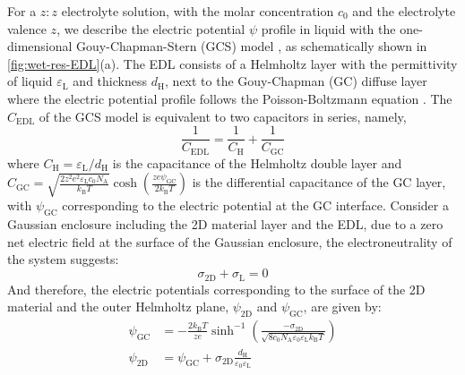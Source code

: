 For a \(z:z\) electrolyte solution, with the molar concentration
\(c_{0}\) and the electrolyte valence \(z\), we describe the electric
potential $\psi$ profile in liquid with the one-dimensional
Gouy-Chapman-Stern (GCS) model \cite{Stern_1924_theory}, as schematically
shown in \autoref{fig:wet-res-EDL}(a).
%
The EDL consists of a
Helmholtz layer with the permittivity of liquid
\(\varepsilon_{\mathrm{L}}\) and thickness \(d_{\mathrm{H}}\), next to
the Gouy-Chapman (GC) diffuse layer where the electric potential
profile follows the Poisson-Boltzmann equation
\cite{Bard_1980_electrochem_book}.
%
The \(C_{\mathrm{EDL}}\) of the
GCS model is equivalent to two capacitors in series,
namely,
\begin{equation}
\label{eqn:wet-GCS-capacitance-series}
\frac{1}{C_{\mathrm{EDL}}} = \frac{1}{C_{\mathrm{H}}} + \frac{1}{C_{\mathrm{GC}}}
\end{equation}
where \(C_{\mathrm{H}}=\varepsilon_{\mathrm{L}}/d_{\mathrm{H}}\) is the
capacitance of the Helmholtz double layer and
\(C_{\mathrm{GC}}=\sqrt{\frac{2z^{2}e^{2}\varepsilon_{\mathrm{L}}c_{0}N_{\mathrm{A}}}{k_{\mathrm{B}}T}}
\cosh(\frac{ze\psi_{\mathrm{GC}}}{2k_{\mathrm{B}}T})\) is the
differential capacitance of the GC layer, with \(\psi_{\mathrm{GC}}\)
corresponding to the electric potential at the GC interface.
%
Consider
a Gaussian enclosure including the 2D material layer and the EDL, due
to a zero net electric field at the surface of the Gaussian enclosure,
the electroneutrality of the system \cite{Bard_1980_electrochem_book}
suggests:
\begin{equation}
\label{eqn:wet-neutrality}
\sigma_{\mathrm{2D}} + \sigma_{\mathrm{L}} = 0
\end{equation}
And therefore, the electric potentials corresponding to the surface of
the 2D material and the outer Helmholtz plane, \(\psi_{\mathrm{2D}}\)
and \(\psi_{\mathrm{GC}}\), are given by:
\begin{equation}
\label{eqn:wet-psi-GC}
\begin{aligned}
  \psi_{\mathrm{GC}} &= -\frac{2k_{\mathrm{B}}T}{ze} 
                         \sinh^{-1}\left(
                         \frac{-\sigma_{\mathrm{2D}}}{\sqrt{8c_{0}N_{\mathrm{A}}\varepsilon_{0}\varepsilon_{\mathrm{L}}k_{\mathrm{B}}T}}
                            \right) \\
  \psi_{\mathrm{2D}} &= \psi_{\mathrm{GC}} + \sigma_{\mathrm{2D}}\frac{d_{\mathrm{H}}}{\varepsilon_{0}\varepsilon_{\mathrm{L}}}
\end{aligned}
\end{equation}
